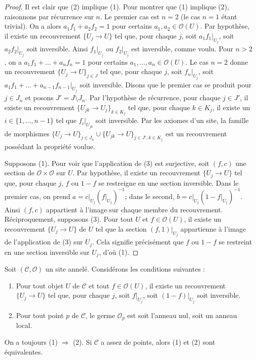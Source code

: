 \begin{proof}
Il est clair que (2) implique (1). Pour montrer que (1) implique (2),
raisonnons par récurrence sur $n$. Le premier cas est $n = 2$ (le cas $n = 1$
étant trivial). On a alors $a_1f_1 + a_2f_2 = 1$ pour certains
$a_1, a_2 \in \mathcal{O}(U)$. Par hypothèse, il existe un recouvrement
$\{U_j \to U\}$ tel que, pour chaque $j$, soit $a_1f_1|_{U_j}$, soit
$a_2f_2|_{U_j}$ soit inversible. Ainsi $f_1|_{U_j}$ ou $f_2|_{U_j}$ est
inversible, comme voulu. Pour $n > 2$, on a
$a_1f_1 + \ldots + a_nf_n = 1$ pour certains
$a_1, \ldots, a_n \in \mathcal{O}(U)$.
Le cas $n = 2$ donne un recouvrement $\{U_j \to U\}_{j \in J}$ tel que, pour
chaque $j$, soit $f_n|_{U_j}$, soit
$a_1f_1 + \ldots + a_{n - 1}f_{n - 1}|_{U_j}$ soit inversible.
Disons que le premier cas se produit pour $j \in J_n$ et posons
$J' = J \setminus J_n$. Par l'hypothèse de récurrence, pour chaque
$j \in J'$, il existe un recouvrement
$\{U_{jk} \to U_j\}_{k \in K_j}$ tel que, pour chaque $k \in K_j$, il existe
un $i \in \{1, \ldots, n - 1\}$ tel que $f_i|_{U_{jk}}$ soit inversible. Par les
axiomes d'un site, la famille de morphismes
$\{U_j \to U\}_{j \in J_n} \cup \{U_{jk} \to U\}_{j \in J', k \in K_j}$
est un recouvrement possédant la propriété voulue.

\medskip\noindent
Supposons (1). Pour voir que l'application de (3) est surjective, soit
$(f, c)$ une section de $\mathcal{O} \times \mathcal{O}$ sur $U$. Par
hypothèse, il existe un recouvrement $\{U_j \to U\}$ tel que, pour chaque $j$,
$f$ ou $1 - f$ se restreigne en une section inversible. Dans le premier cas, on
prend $a = c|_{U_j} (f|_{U_j})^{-1}$; dans le second,
$b = c|_{U_j} (1 - f|_{U_j})^{-1}$. Ainsi $(f, c)$ appartient à l'image sur
chaque membre du recouvrement. Réciproquement, supposons (3). Pour tout $U$ et
$f \in \mathcal{O}(U)$, il existe un recouvrement $\{U_j \to U\}$ de $U$ tel que la
section $(f, 1)|_{U_j}$ appartienne à l'image de l'application de (3) sur
$U_j$. Cela signifie précisément que $f$ ou $1 - f$ se restreint en une section
inversible sur $U_j$, d'où (1).
\end{proof}

\begin{lemma}
\label{lemma-locally-ringed-stalk}
Soit $(\mathcal{C}, \mathcal{O})$ un site annelé. Considérons les conditions suivantes :
\begin{enumerate}
\item Pour tout objet $U$ de $\mathcal{C}$ et tout $f \in \mathcal{O}(U)$,
il existe un recouvrement $\{U_j \to U\}$ tel que, pour chaque $j$, soit
$f|_{U_j}$, soit $(1 - f)|_{U_j}$ soit inversible.
\item Pour tout point $p$ de $\mathcal{C}$, le germe $\mathcal{O}_p$ est
soit l'anneau nul, soit un anneau local.
\end{enumerate}
On a toujours (1) $\Rightarrow$ (2). Si $\mathcal{C}$ a assez de points,
alors (1) et (2) sont équivalentes.
\end{lemma}

